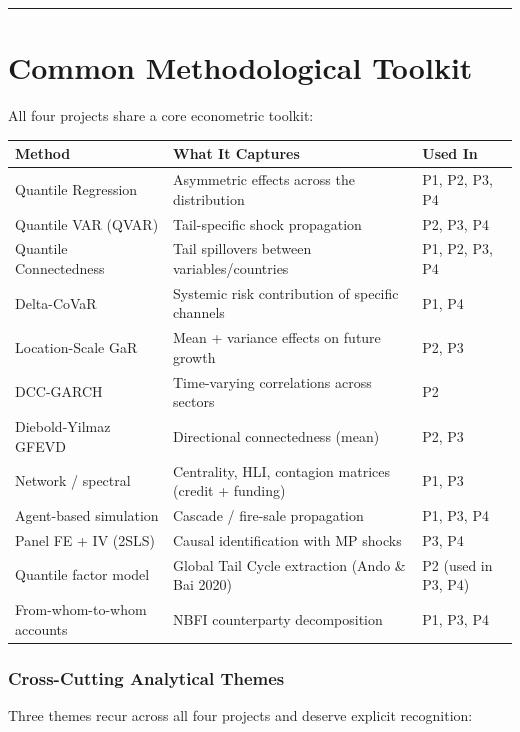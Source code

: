 \documentclass[11pt,a4paper]{article}
\begin{document}
\bigskip\noindent\rule{\textwidth}{0.4pt}\bigskip


\section{Common Methodological Toolkit}

All four projects share a core econometric toolkit:


{\small
\begin{longtable}{|p{}|p{}|p{}|}
\hline
\textbf{Method} & \textbf{What It Captures} & \textbf{Used In} \\
\hline
\endhead
Quantile Regression & Asymmetric effects across the distribution & P1, P2, P3, P4 \\
\hline
Quantile VAR (QVAR) & Tail-specific shock propagation & P2, P3, P4 \\
\hline
Quantile Connectedness & Tail spillovers between variables/countries & P1, P2, P3, P4 \\
\hline
Delta-CoVaR & Systemic risk contribution of specific channels & P1, P4 \\
\hline
Location-Scale GaR & Mean + variance effects on future growth & P2, P3 \\
\hline
DCC-GARCH & Time-varying correlations across sectors & P2 \\
\hline
Diebold-Yilmaz GFEVD & Directional connectedness (mean) & P2, P3 \\
\hline
Network / spectral & Centrality, HLI, contagion matrices (credit + funding) & P1, P3 \\
\hline
Agent-based simulation & Cascade / fire-sale propagation & P1, P3, P4 \\
\hline
Panel FE + IV (2SLS) & Causal identification with MP shocks & P3, P4 \\
\hline
Quantile factor model & Global Tail Cycle extraction (Ando \& Bai 2020) & P2 (used in P3, P4) \\
\hline
From-whom-to-whom accounts & NBFI counterparty decomposition & P1, P3, P4 \\
\hline
\end{longtable}
}


\subsubsection{Cross-Cutting Analytical Themes}

Three themes recur across all four projects and deserve explicit recognition:
\end{document}
